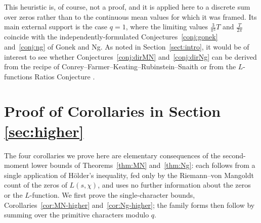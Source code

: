\documentclass[12pt,a4paper,reqno]{amsart}
\theoremstyle{remark}
\numberwithin{equation}{section}
\begin{document}
This heuristic is, of course, not a proof, and it is applied here to a discrete sum over zeros rather than to the continuous mean values for which it was framed. Its main external support is the case $q=1$, where the limiting values $\tfrac{3}{\pi^3}T$ and $\tfrac{T}{2\pi}$ coincide with the independently-formulated Conjectures~\ref{conj:gonek} and~\ref{conj:ng} of Gonek and Ng. As noted in Section~\ref{sect:intro}, it would be of interest to see whether Conjectures~\ref{conj:dirMN} and~\ref{conj:dirNg} can be derived from the recipe of Conrey--Farmer--Keating--Rubinstein--Snaith \cite{CFKRS} or from the $L$-functions Ratios Conjecture \cite{CFZ,ConreySnaith}.

\section{Proof of Corollaries in Section \ref{sec:higher}}\label{sec:higher-proofs}

The four corollaries we prove here are elementary consequences of the second-moment lower bounds of Theorems~\ref{thm:MN} and~\ref{thm:Ng}: each follows from a single application of H\"older's inequality, fed only by the Riemann--von Mangoldt count of the zeros of $L(s,\chi)$, and uses no further information about the zeros or the $L$-function. We first prove the single-character bounds, Corollaries~\ref{cor:MN-higher} and~\ref{cor:Ng-higher}; the family forms then follow by summing over the primitive characters modulo $q$.
\end{document}
